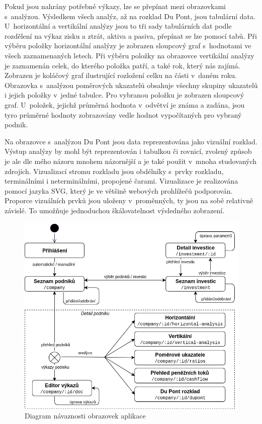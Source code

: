Pokud jsou nahrány potřebné výkazy, lze se přepínat mezi obrazovkami s~analýzou. Výsledkem všech analýz, až na rozklad Du Pont, jsou tabulární data. U~horizontální a vertikální analýzy jsou to tři sady tabulárních dat podle rozdělení na výkaz zisku a ztrát, aktiva a pasiva, přepínat se lze pomocí tabů. Při výběru položky horizontální analýzy je zobrazen sloupcový graf s~hodnotami ve všech zaznamenaných letech. Při výběru položky na obrazovce vertikální analýzy je zaznamenán celek, do kterého položka patří, a také rok, který nás zajímá. Zobrazen je koláčový graf ilustrující rozložení celku na části v~daném roku. Obrazovka s~analýzou poměrových ukazatelů obsahuje všechny skupiny ukazatelů i jejich položky v~jedné tabulce. Pro vybranou položku je zobrazen sloupcový graf. U~položek, jejichž průměrná hodnota v~odvětví je známa a zadána, jsou tyro průměrné hodnoty zobrazovány vedle hodnot vypočítaných pro vybraný podnik.

Na obrazovce s~analýzou Du Pont jsou data reprezentována jako vizuální rozklad. Výstup analýzy by mohl být reprezentován i tabulkou či rovnicí, zvolený způsob je ale dle mého názoru mnohem názornější a je také použit v~mnoha studovaných zdrojích. Vizualizací stromu rozkladu jsou obdélníky s~prvky rozkladu, terminálními i neterminálními, propojené čarami. Vizualizace je realizována pomocí jazyka SVG, který je ve většině webových prohlížečů podporován. Proporce vizuálních prvků jsou uloženy v~proměnných, ty jsou na sobě relativně závislé. To umožňuje jednoduchou škálovatelnost výsledného zobrazení.

\begin{figure}[!htb]
  \centering
  \includegraphics[width=13.5cm]{img/screens.png}
  \caption{Diagram návaznosti obrazovek aplikace}
\end{figure}

